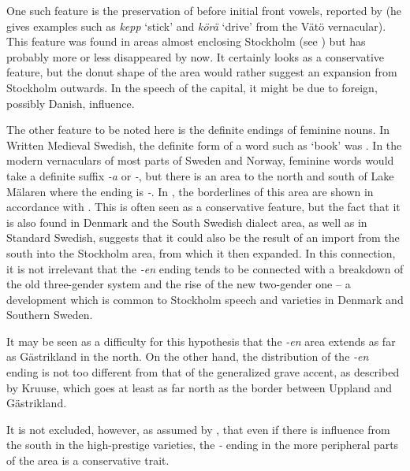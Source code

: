 One such feature is the preservation of  before initial front vowels, reported by \citet{Kruuse1908} (he gives examples such as \textit{kepp} ‘stick’ and \textit{körä} ‘drive’ from the Vätö vernacular). This feature was found in areas almost enclosing Stockholm (see ) but has probably more or less disappeared by now. It certainly looks as a conservative feature, but the donut shape of the area would rather suggest an expansion from Stockholm outwards. In the speech of the capital, it might be due to foreign, possibly Danish, influence.

The other feature to be noted here is the definite endings of feminine nouns. In Written Medieval Swedish, the definite form of a word such as  ‘book’ was . In the modern vernaculars of most parts of Sweden and Norway, feminine words would take a definite suffix\textit{ {}-a} or\textit{ {}-}, but there is an area to the north and south of Lake Mälaren where the ending is\textit{ {}-}. In , the borderlines of this area are shown in accordance with \citet{Modéer1946}. This is often seen as a conservative feature, but the fact that it is also found in Denmark and the South Swedish dialect area, as well as in Standard Swedish, suggests that it could also be the result of an import from the south into the Stockholm area, from which it then expanded. In this connection, it is not irrelevant that the \textit{{}-en} ending tends to be connected with a breakdown of the old three-gender system and the rise of the new two-gender one – a development which is common to Stockholm speech and varieties in Denmark and Southern Sweden.

It may be seen as a difficulty for this hypothesis that the \textit{{}-en} area extends as far as Gästrikland in the north. On the other hand, the distribution of the \textit{{}-}\textit{en} ending is not too different from that of the generalized grave accent, as described by Kruuse, which goes at least as far north as the border between Uppland and Gästrikland.

It is not excluded, however, as assumed by \citet[239]{LindströmEtAl2006}, that even if there is influence from the south in the high-prestige varieties, the\textit{ {}-} ending in the more peripheral parts of the area is a conservative trait.

